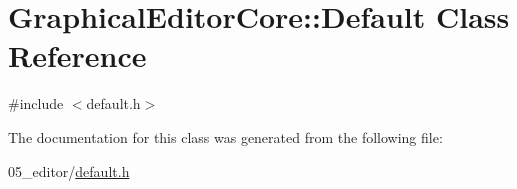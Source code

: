 \hypertarget{classGraphicalEditorCore_1_1Default}{}\section{Graphical\+Editor\+Core\+:\+:Default Class Reference}
\label{classGraphicalEditorCore_1_1Default}


{\ttfamily \#include $<$default.\+h$>$}



The documentation for this class was generated from the following file\+:\begin{DoxyCompactItemize}
\item 
05\+\_\+editor/\hyperlink{default_8h}{default.\+h}\end{DoxyCompactItemize}
